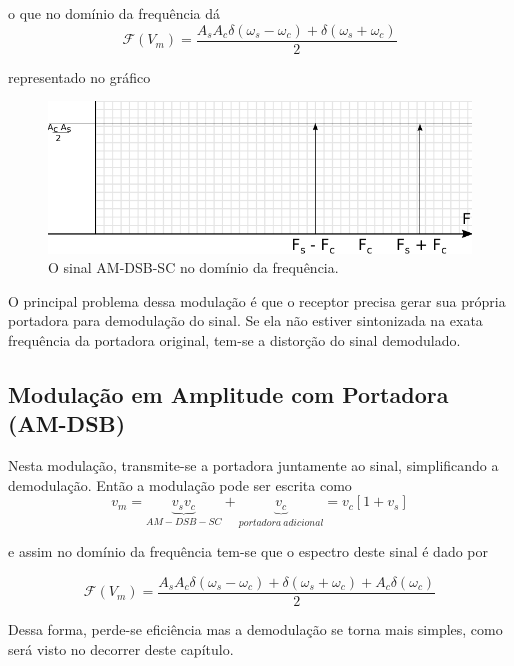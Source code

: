 \documentclass[]{report}
\begin{document}
o que no domínio da frequência dá
\begin{equation}
\mathcal{F}(V_m)= \frac{A_s A_c \delta(\omega_s - \omega_c) + \delta(\omega_s + \omega_c)}{2}
\end{equation}

representado no gráfico
\begin{figure}[H]
\begin{center}
\includegraphics[scale=0.8,clip]{./imagens/frequencia_AM_DSB_SC}
\end{center}
\caption{O sinal AM-DSB-SC no domínio da frequência.}
\label{fig:am_dsb_sc_frequencia}
\end{figure}

O principal problema dessa modulação é que o receptor precisa gerar sua própria portadora para demodulação do sinal. Se ela não estiver sintonizada na exata frequência da portadora original, tem-se a distorção do sinal demodulado. 

\subsection{Modulação em Amplitude com Portadora (AM-DSB)}
Nesta modulação, transmite-se a portadora juntamente ao sinal, simplificando a demodulação. Então a modulação pode ser escrita como
\begin{equation}\label{eq_am_dsb_tempo}
v_m = \underbrace{v_s v_c}_{AM-DSB-SC} + \underbrace{v_c}_{portadora\ adicional} = v_c [1 + v_s]
\end{equation}

e assim no domínio da frequência tem-se que o espectro deste sinal é dado por

\begin{equation}
\mathcal{F}(V_m)= \frac{A_s A_c \delta(\omega_s - \omega_c) + \delta(\omega_s + \omega_c) + A_c \delta(\omega_c)}{2}
\end{equation}

Dessa forma, perde-se eficiência mas a demodulação se torna mais simples, como será visto no decorrer deste capítulo.
\end{document}
